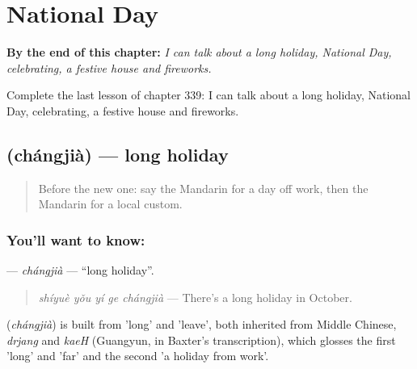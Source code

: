 
\chapter{National Day}
\label{ch:zh-national-day}

\begin{chapteropening}
\textbf{By the end of this chapter:} \emph{I can talk about a long holiday, National Day, celebrating, a festive house and fireworks.}

Complete the last lesson of chapter 339: I can talk about a long holiday, National Day, celebrating, a festive house and fireworks.
\end{chapteropening}

\section[\texorpdfstring{\zh{长假} (chángjià)}{长假 (chángjià)}]{ (chángjià) — long holiday}

\label{lesson:ZH-C339-changjia}



\begin{quote}
Before the new one: say the Mandarin for a day off work, then the Mandarin for a local custom.
\end{quote}

\subsection*{You'll want to know: }
\textbf{} — \emph{chángjià} — \textquotedblleft{}long holiday\textquotedblright{}.

\begin{quote}
\textbf{} \emph{shíyuè yǒu yí ge chángjià} — There's a long holiday in October.
\end{quote}

\begin{cousinweb}
\textbf{} (\emph{chángjià}) is built from  'long' and  'leave', both inherited from Middle Chinese, \emph{drjang} and \emph{kaeH} (Guangyun, in Baxter's transcription), which glosses the first 'long' and 'far' and the second 'a holiday from work'.
\end{cousinweb}


